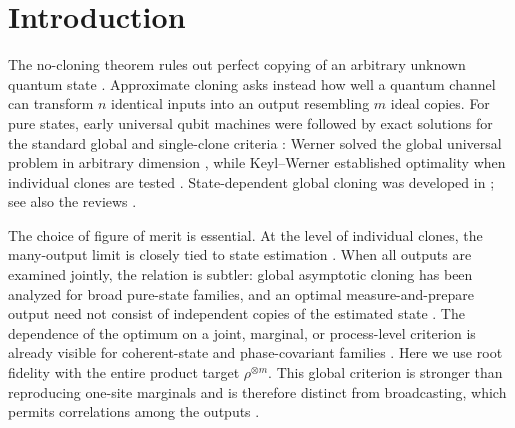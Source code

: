 \documentclass[11pt]{article}
\theoremstyle{remark}
\theoremstyle{plain}
\newcommand{\ot}{\otimes}
\begin{document}
\tableofcontents

\section{Introduction}\label{sec:introduction-results}

The no-cloning theorem rules out perfect copying of an arbitrary unknown
quantum state \cite{WoottersZurek1982,Dieks1982}.  Approximate cloning asks
instead how well a quantum channel can transform \(n\) identical inputs into
an output resembling \(m\) ideal copies.  For pure states, early universal
qubit machines were followed by exact solutions for the standard global and
single-clone criteria
\cite{BuzekHillery1996,GisinMassar1997,
BrussDiVincenzoEkertFuchsMacchiavelloSmolin1998}: Werner solved the global
universal problem in arbitrary dimension \cite{Werner1998}, while
Keyl--Werner established optimality when individual clones are tested
\cite{KeylWerner1999}.  State-dependent global cloning was developed in
\cite{BrussDiVincenzoEkertFuchsMacchiavelloSmolin1998,
CheflesBarnett1999}; see also the reviews
\cite{ScaraniIblisdirGisinAcin2005,FanWangJingYueShiZhangMu2014}.

The choice of figure of merit is essential.  At the level of individual
clones, the many-output limit is closely tied to state estimation
\cite{MassarPopescu1995,BrussEkertMacchiavello1998,BaeAcin2006,
ChiribellaDAriano2006}.  When all outputs are examined jointly, the relation
is subtler: global asymptotic cloning has been analyzed for broad pure-state
families, and an optimal measure-and-prepare output need not consist of
independent copies of the estimated state
\cite{ChiribellaYang2014Optimal}.  The dependence of the optimum on a joint,
marginal, or process-level criterion is already visible for coherent-state
and phase-covariant families
\cite{CerfKrugerNavezWernerWolf2005,KimChitambar2022}.  Here we use root
fidelity with the entire product target \(\rho^{\ot m}\).  This global
criterion is stronger than reproducing one-site marginals and is therefore
distinct from broadcasting, which permits correlations among the outputs
\cite{BarnumCavesFuchsJozsaSchumacher1996}.
\end{document}
